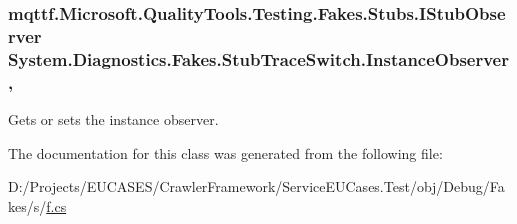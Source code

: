 \hypertarget{class_system_1_1_diagnostics_1_1_fakes_1_1_stub_trace_switch_a6792dbf2d5dfa47ad6a00210dc47a73c}{
\subsubsection[{Instance\-Observer}]{\setlength{\rightskip}{0pt plus 5cm}mqttf.\-Microsoft.\-Quality\-Tools.\-Testing.\-Fakes.\-Stubs.\-I\-Stub\-Observer System.\-Diagnostics.\-Fakes.\-Stub\-Trace\-Switch.\-Instance\-Observer\hspace{0.3cm}{\ttfamily [get]}, {\ttfamily [set]}}}\label{class_system_1_1_diagnostics_1_1_fakes_1_1_stub_trace_switch_a6792dbf2d5dfa47ad6a00210dc47a73c}


Gets or sets the instance observer.



The documentation for this class was generated from the following file\-:\begin{DoxyCompactItemize}
\item 
D\-:/\-Projects/\-E\-U\-C\-A\-S\-E\-S/\-Crawler\-Framework/\-Service\-E\-U\-Cases.\-Test/obj/\-Debug/\-Fakes/s/\hyperlink{s_2f_8cs}{f.\-cs}\end{DoxyCompactItemize}
